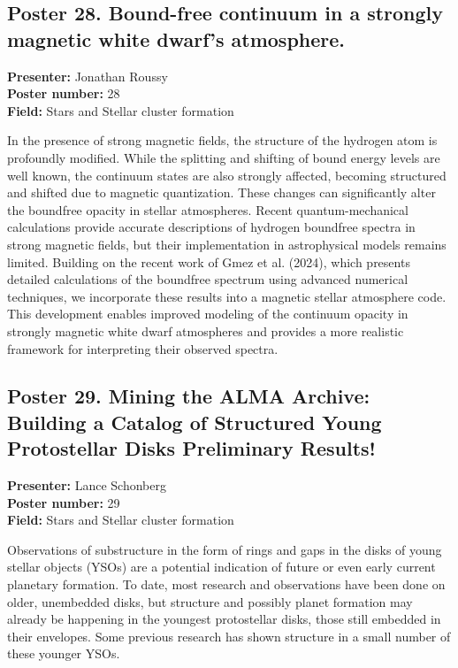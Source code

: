 \hypertarget{poster-abstract-talk-240}{}\label{poster-abstract-page-talk-240}
\subsection*{Poster 28. Bound-free continuum in a strongly magnetic white dwarf's atmosphere.}
\textbf{Presenter:} Jonathan Roussy\\
\textbf{Poster number:} 28\\
\textbf{Field:} Stars and Stellar cluster formation

In the presence of strong magnetic fields, the structure of the hydrogen atom is profoundly modified. While the splitting and shifting of bound energy levels are well known, the continuum states are also strongly affected, becoming structured and shifted due to magnetic quantization. These changes can significantly alter the boundfree opacity in stellar atmospheres. Recent quantum-mechanical calculations provide accurate descriptions of hydrogen boundfree spectra in strong magnetic fields, but their implementation in astrophysical models remains limited. Building on the recent work of Gmez et al. (2024), which presents detailed calculations of the boundfree spectrum using advanced numerical techniques, we incorporate these results into a magnetic stellar atmosphere code. This development enables improved modeling of the continuum opacity in strongly magnetic white dwarf atmospheres and provides a more realistic framework for interpreting their observed spectra.

\hypertarget{poster-abstract-talk-48}{}\label{poster-abstract-page-talk-48}
\subsection*{Poster 29. Mining the ALMA Archive: Building a Catalog of Structured Young Protostellar Disks Preliminary Results!}
\textbf{Presenter:} Lance Schonberg\\
\textbf{Poster number:} 29\\
\textbf{Field:} Stars and Stellar cluster formation

Observations of substructure in the form of rings and gaps in the disks of young stellar objects (YSOs) are a potential indication of future or even early current planetary formation. To date, most research and observations have been done on older, unembedded disks, but structure and possibly planet formation may already be happening in the youngest protostellar disks, those still embedded in their envelopes. Some previous research has shown structure in a small number of these younger YSOs.

